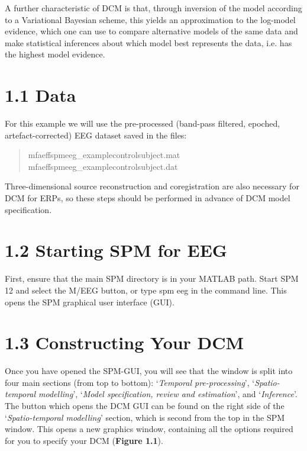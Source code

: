 A further characteristic of DCM is that, through inversion of the model
according to a Variational Bayesian scheme, this yields an approximation
to the log-model evidence, which one can use to compare alternative
models of the same data and make statistical inferences about which
model best represents the data, i.e. has the highest model evidence.

\section{\texorpdfstring{\textbf{1.1 Data}}{1.1 Data}}\label{data}

For this example we will use the pre-processed (band-pass filtered,
epoched, artefact-corrected) EEG dataset saved in the files:

\begin{quote}
mfaeffspmeeg\_examplecontrolsubject.mat\\
mfaeffspmeeg\_examplecontrolsubject.dat
\end{quote}

Three-dimensional source reconstruction and coregistration are also
necessary for DCM for ERPs, so these steps should be performed in
advance of DCM model specification.

\section{\texorpdfstring{\textbf{1.2 Starting SPM for
EEG}}{1.2 Starting SPM for EEG}}\label{starting-spm-for-eeg}

First, ensure that the main SPM directory is in your MATLAB path. Start
SPM 12 and select the M/EEG button, or type spm eeg in the command line.
This opens the SPM graphical user interface (GUI).

\section{\texorpdfstring{\textbf{1.3 Constructing Your
DCM}}{1.3 Constructing Your DCM}}\label{constructing-your-dcm}

Once you have opened the SPM-GUI, you will see that the window is split
into four main sections (from top to bottom): `\emph{Temporal
pre-processing}', `\emph{Spatio-temporal modelling}', `\emph{Model
specification, review and estimation}', and `\emph{Inference}'. The
button which opens the DCM GUI can be found on the right side of the
`\emph{Spatio-temporal modelling}' section, which is second from the top
in the SPM window. This opens a new graphics window, containing all the
options required for you to specify your DCM (\textbf{Figure 1.1}).

